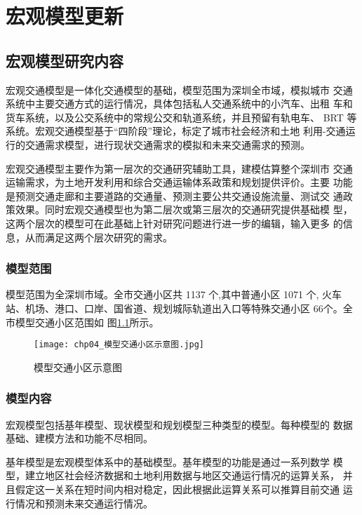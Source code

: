 

\chapter{宏观模型更新}

\section{宏观模型研究内容}
宏观交通模型是一体化交通模型的基础，模型范围为深圳全市域，模拟城市
交通系统中主要交通方式的运行情况，具体包括私人交通系统中的小汽车、出租
车和货车系统，以及公交系统中的常规公交和轨道系统，并且预留有轨电车、
BRT 等系统。宏观交通模型基于“四阶段”理论，标定了城市社会经济和土地
利用-交通运行的交通需求模型，进行现状交通需求的模拟和未来交通需求的预测。

宏观交通模型主要作为第一层次的交通研究辅助工具，建模估算整个深圳市
交通运输需求，为土地开发利用和综合交通运输体系政策和规划提供评价。主要
功能是预测交通走廊和主要道路的交通量、预测主要公共交通设施流量、测试交
通政策效果。同时宏观交通模型也为第二层次或第三层次的交通研究提供基础模
型，这两个层次的模型可在此基础上针对研究问题进行进一步的编辑，输入更多
的信息，从而满足这两个层次研究的需求。

\subsection{模型范围}
模型范围为全深圳市域。全市交通小区共 1137 个,其中普通小区 1071 个,
火车站、机场、港口、口岸、国省道、规划城际轨道出入口等特殊交通小区 66个。全市模型交通小区范围如
图\ref{fig:模型交通小区示意图}所示。

\begin{figure}[ht]
  \centering
  \texttt{[image: chp04\_模型交通小区示意图.jpg]}
  \caption{模型交通小区示意图\label{fig:模型交通小区示意图} }
\end{figure}

\subsection{模型内容}
宏观模型包括基年模型、现状模型和规划模型三种类型的模型。每种模型的
数据基础、建模方法和功能不尽相同。

基年模型是宏观模型体系中的基础模型。基年模型的功能是通过一系列数学
模型，建立地区社会经济数据和土地利用数据与地区交通运行情况的运算关系，
并且假定这一关系在短时间内相对稳定，因此根据此运算关系可以推算目前交通
运行情况和预测未来交通运行情况。

